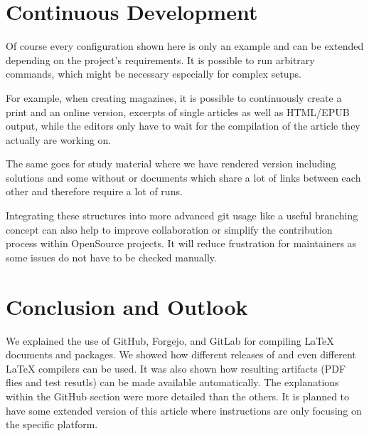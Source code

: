 \documentclass[final]{ltugboat}
\newcommand*{\TeXLive}{\acro{\TeX\,Live}\xspace}
\begin{document}


\section{Continuous Development}

Of course every configuration shown here is only an example and can be extended depending on the project's requirements.
It is possible to run arbitrary commands, which might be necessary especially for complex setups.

For example, when creating magazines, it is possible to continuously create a print and an online version, excerpts of single articles as well as HTML/EPUB output, while the editors only have to wait for the compilation of the article they actually are working on.

The same goes for study material where we have rendered version including solutions and some without or documents which share a lot of links between each other and therefore require a lot of runs.

Integrating these structures into more advanced git usage like a useful branching concept can also help to improve collaboration or simplify the contribution process within OpenSource projects.
It will reduce frustration for maintainers as some issues do not have to be checked manually.

\section{Conclusion and Outlook}

We explained the use of GitHub, Forgejo, and GitLab for compiling \LaTeX{} documents and packages.
We showed how different releases of \TeXLive{} and even different \LaTeX{} compilers can be used.
It was also shown how resulting artifacts (PDF flies and test resutls) can be made available automatically.
The explanations within the GitHub section were more detailed than the others.
It is planned to have some extended version of this article where instructions are only focusing on the specific platform.
\end{document}
